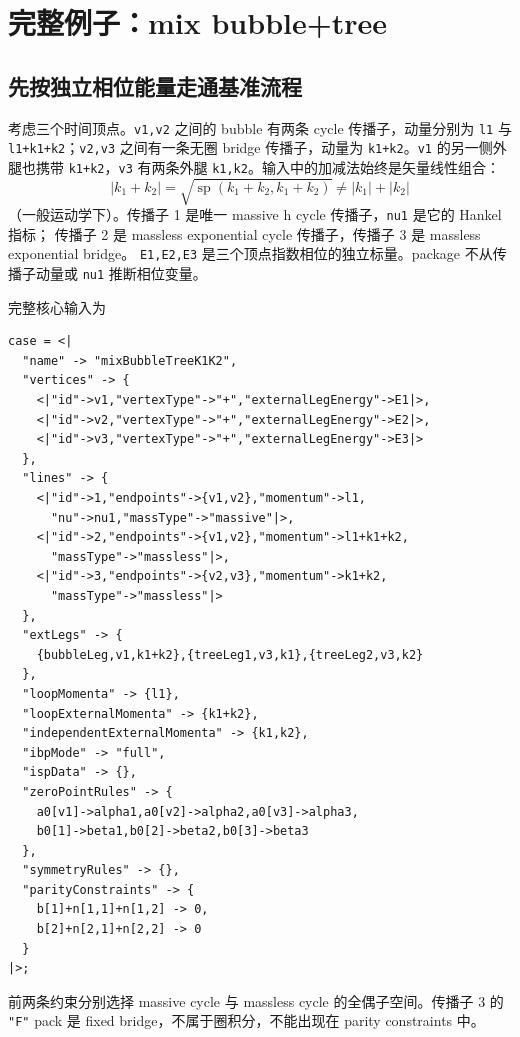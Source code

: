 ﻿\documentclass[a4paper,11pt]{article}
\begin{document}
\section{完整例子：mix bubble+tree}

\subsection{先按独立相位能量走通基准流程}

考虑三个时间顶点。\texttt{v1,v2} 之间的 bubble 有两条 cycle 传播子，动量分别为
\texttt{l1} 与 \texttt{l1+k1+k2}；\texttt{v2,v3} 之间有一条无圈 bridge 传播子，动量为
\texttt{k1+k2}。\texttt{v1} 的另一侧外腿也携带 \texttt{k1+k2}，\texttt{v3} 有两条外腿
\texttt{k1,k2}。输入中的加减法始终是矢量线性组合：
\begin{equation}
 |k_1+k_2|=\sqrt{\operatorname{sp}(k_1+k_2,k_1+k_2)}
 \neq |k_1|+|k_2|
\end{equation}
（一般运动学下）。传播子 1 是唯一 massive h cycle 传播子，\texttt{nu1} 是它的 Hankel 指标；
传播子 2 是 massless exponential cycle 传播子，传播子 3 是 massless exponential bridge。
\texttt{E1,E2,E3} 是三个顶点指数相位的独立标量。package 不从传播子动量或 \texttt{nu1} 推断相位变量。

完整核心输入为
\begin{verbatim}
case = <|
  "name" -> "mixBubbleTreeK1K2",
  "vertices" -> {
    <|"id"->v1,"vertexType"->"+","externalLegEnergy"->E1|>,
    <|"id"->v2,"vertexType"->"+","externalLegEnergy"->E2|>,
    <|"id"->v3,"vertexType"->"+","externalLegEnergy"->E3|>
  },
  "lines" -> {
    <|"id"->1,"endpoints"->{v1,v2},"momentum"->l1,
      "nu"->nu1,"massType"->"massive"|>,
    <|"id"->2,"endpoints"->{v1,v2},"momentum"->l1+k1+k2,
      "massType"->"massless"|>,
    <|"id"->3,"endpoints"->{v2,v3},"momentum"->k1+k2,
      "massType"->"massless"|>
  },
  "extLegs" -> {
    {bubbleLeg,v1,k1+k2},{treeLeg1,v3,k1},{treeLeg2,v3,k2}
  },
  "loopMomenta" -> {l1},
  "loopExternalMomenta" -> {k1+k2},
  "independentExternalMomenta" -> {k1,k2},
  "ibpMode" -> "full",
  "ispData" -> {},
  "zeroPointRules" -> {
    a0[v1]->alpha1,a0[v2]->alpha2,a0[v3]->alpha3,
    b0[1]->beta1,b0[2]->beta2,b0[3]->beta3
  },
  "symmetryRules" -> {},
  "parityConstraints" -> {
    b[1]+n[1,1]+n[1,2] -> 0,
    b[2]+n[2,1]+n[2,2] -> 0
  }
|>;
\end{verbatim}

前两条约束分别选择 massive cycle 与 massless cycle 的全偶子空间。传播子 3 的
\texttt{"F"} pack 是 fixed bridge，不属于圈积分，不能出现在 parity constraints 中。
\end{document}

